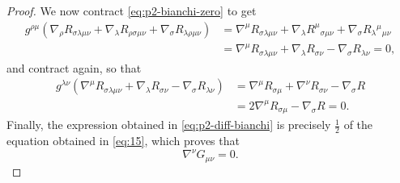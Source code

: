 \documentclass[11pt]{article}
\begin{document}
\begin{proof}
  We now contract \cref{eq:p2-bianchi-zero} to get
  \begin{equation}
  \label{eq:8}
  \begin{aligned}
    g^{\rho\mu}\left( \nabla_{\rho}R_{\sigma\lambda\mu\nu} + \nabla_{\lambda}R_{\rho\sigma\mu\nu} + \nabla_{\sigma}R_{\lambda\rho\mu\nu} \right) &= \nabla^{\mu}R_{\sigma\lambda\mu\nu} + \nabla_{\lambda}R^{\mu}{}_{\sigma\mu\nu} + \nabla_{\sigma}R_{\lambda}{}^{\mu}{}_{\mu\nu} \\
    &= \nabla^{\mu}R_{\sigma\lambda\mu\nu} + \nabla_{\lambda}R_{\sigma\nu} - \nabla_{\sigma}R_{\lambda\nu} = 0,
  \end{aligned}
\end{equation}
and contract again, so that
\begin{equation}
\label{eq:15}
\begin{aligned}
  g^{\lambda\nu}\left( \nabla^{\mu}R_{\sigma\lambda\mu\nu} + \nabla_{\lambda}R_{\sigma\nu} - \nabla_{\sigma}R_{\lambda\nu} \right) &= \nabla^{\mu}R_{\sigma\mu} + \nabla^{\nu}R_{\sigma\nu} - \nabla_{\sigma}R \\
  &= 2\nabla^{\mu}R_{\sigma\mu} - \nabla_{\sigma}R = 0.
\end{aligned}
\end{equation}
Finally, the expression obtained in \cref{eq:p2-diff-bianchi} is precisely \( \frac{1}{2} \) of the equation obtained in \cref{eq:15}, which proves that
\begin{equation}
\label{eq:16}
\nabla^{\nu}G_{\mu\nu} = 0.
\end{equation}
\end{proof}
\end{document}
